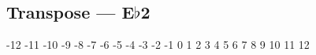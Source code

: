 \subsection{Transpose --- \UiKey{\SET}E$\flat$2}





























-12
-11
-10
-9
-8
-7
-6
-5
-4
-3
-2
-1
0
1
2
3
4
5
6
7
8
9
10
11
12
